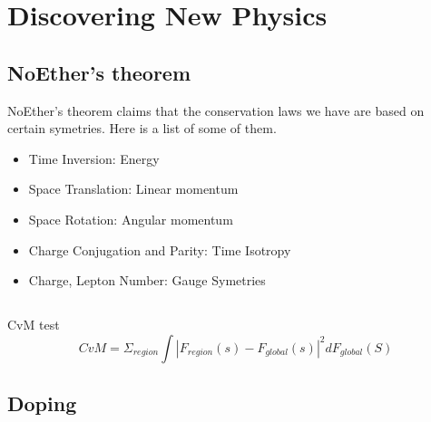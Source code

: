 \section {Discovering New Physics}


\subsection{NoEther's theorem}

NoEther's theorem claims that the conservation laws we have are based on certain symetries.
Here is a list of some of them.
\begin{itemize}
  \item Time Inversion: Energy
  \item Space Translation: Linear momentum
  \item Space Rotation: Angular momentum
  \item Charge Conjugation and Parity: Time Isotropy
  \item Charge, Lepton Number: Gauge Symetries 
\end{itemize}

\subsection{}

CvM test 
\begin{equation}
  CvM = \Sigma_{region} \int |F_{region}(s) - F_{global}(s)|^2 dF_{global}(S)
\end{equation}


\subsection{Doping}

